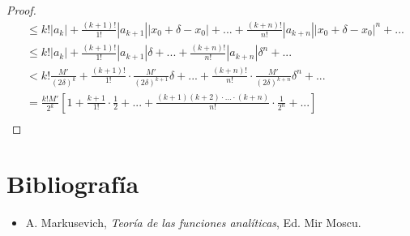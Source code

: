 \documentclass[12pt]{report}
\theoremstyle{largebreak}
\newcommand\abs[1]{\ensuremath{\left|#1\right|}}
\begin{document}
\begin{proof}
\begin{equation*}
\begin{split}
                &\leq k!\abs{a_k}+\frac{(k+1)!}{1!}\abs{a_{ k+1}}\abs{x_0+\delta-x_0}+...+\frac{(k+n)!}{n!}\abs{a_{ k+n}}\abs{x_0+\delta-x_0}^n+...\\
                &\leq k!\abs{a_k}+\frac{(k+1)!}{1!}\abs{a_{ k+1}}\delta+...+\frac{(k+n)!}{n!}\abs{a_{ k+n}}\delta^n+...\\
                &< k!\frac{M'}{(2\delta)^k}+\frac{(k+1)!}{1!}\cdot\frac{M'}{(2\delta)^{ k+1}}\delta+...+\frac{(k+n)!}{n!}\cdot\frac{M'}{(2\delta)^{ k+n}}\delta^n+...\\
                &=\frac{k!M'}{2^k}\left[1+\frac{k+1}{1!}\cdot\frac{1}{2}+...+\frac{(k+1)(k+2)\cdot...\cdot(k+n)}{n!}\cdot\frac{1}{2^n}+... \right]\\
            \end{split}
        \end{equation*}

    \end{proof}

    \chapter*{Bibliografía}

    \begin{itemize}
        \item A. Markusevich, \textit{Teoría de las funciones analíticas}, Ed. Mir Moscu.
    \end{itemize}
    
\end{document}
